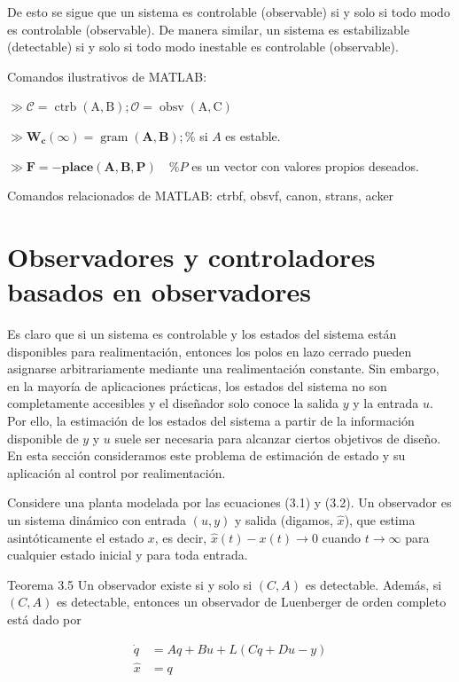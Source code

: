 De esto se sigue que un sistema es controlable (observable) si y solo si todo modo es controlable (observable). De manera similar, un sistema es estabilizable (detectable) si y solo si todo modo inestable es controlable (observable).

Comandos ilustrativos de MATLAB:

$\gg \mathcal{C}=\operatorname{ctrb}(\mathrm{A}, \mathrm{B}) ; \mathcal{O}=\operatorname{obsv}(\mathrm{A}, \mathrm{C})$

$\gg \mathbf{W}_{\mathbf{c}}(\infty)=\operatorname{gram}(\mathbf{A}, \mathbf{B}) ; \%$ si $A$ es estable.

$\gg \mathbf{F}=-\mathbf{p l a c e}(\mathbf{A}, \mathbf{B}, \mathbf{P}) \quad \% P$ es un vector con valores propios deseados.

Comandos relacionados de MATLAB: ctrbf, obsvf, canon, strans, acker

\section{Observadores y controladores basados en observadores}
Es claro que si un sistema es controlable y los estados del sistema están disponibles para realimentación, entonces los polos en lazo cerrado pueden asignarse arbitrariamente mediante una realimentación constante. Sin embargo, en la mayoría de aplicaciones prácticas, los estados del sistema no son completamente accesibles y el diseñador solo conoce la salida $y$ y la entrada $u$. Por ello, la estimación de los estados del sistema a partir de la información disponible de $y$ y $u$ suele ser necesaria para alcanzar ciertos objetivos de diseño. En esta sección consideramos este problema de estimación de estado y su aplicación al control por realimentación.

Considere una planta modelada por las ecuaciones (3.1) y (3.2). Un observador es un sistema dinámico con entrada $(u, y)$ y salida (digamos, $\hat{x}$), que estima asintóticamente el estado $x$, es decir, $\hat{x}(t)-x(t) \rightarrow 0$ cuando $t \rightarrow \infty$ para cualquier estado inicial y para toda entrada.

Teorema 3.5 Un observador existe si y solo si $(C, A)$ es detectable. Además, si $(C, A)$ es detectable, entonces un observador de Luenberger de orden completo está dado por


\begin{align*}
\dot{q} & =A q+B u+L(C q+D u-y)  \tag{3.3}\\
\hat{x} & =q \tag{3.4}
\end{align*}


